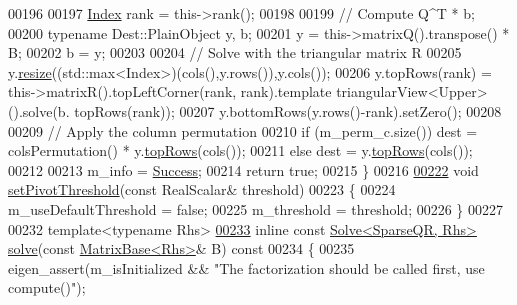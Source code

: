 \begin{DoxyCode}
00196 
00197       \hyperlink{namespace_eigen_a62e77e0933482dafde8fe197d9a2cfde}{Index} rank = this->rank();
00198       
00199       \textcolor{comment}{// Compute Q^T * b;}
00200       \textcolor{keyword}{typename} Dest::PlainObject y, b;
00201       y = this->matrixQ().transpose() * B; 
00202       b = y;
00203       
00204       \textcolor{comment}{// Solve with the triangular matrix R}
00205       y.\hyperlink{group___core___module_a13027a493a68a13496610caf3d81bd3e}{resize}((std::max<Index>)(cols(),y.rows()),y.cols());
00206       y.topRows(rank) = this->matrixR().topLeftCorner(rank, rank).template triangularView<Upper>().solve(b.
      topRows(rank));
00207       y.bottomRows(y.rows()-rank).setZero();
00208       
00209       \textcolor{comment}{// Apply the column permutation}
00210       \textcolor{keywordflow}{if} (m\_perm\_c.size())  dest = colsPermutation() * y.\hyperlink{group___core___module_ad3e01f9216955704228eaeac0b442d24}{topRows}(cols());
00211       \textcolor{keywordflow}{else}                  dest = y.\hyperlink{group___core___module_ad3e01f9216955704228eaeac0b442d24}{topRows}(cols());
00212       
00213       m\_info = \hyperlink{group__enums_gga85fad7b87587764e5cf6b513a9e0ee5ea52581b035f4b59c203b8ff999ef5fcea}{Success};
00214       \textcolor{keywordflow}{return} \textcolor{keyword}{true};
00215     \}
00216 
\hyperlink{group___sparse_q_r___module_adb7bfa65f99e3ef91ed58ea663a850a1}{00222}     \textcolor{keywordtype}{void} \hyperlink{group___sparse_q_r___module_adb7bfa65f99e3ef91ed58ea663a850a1}{setPivotThreshold}(\textcolor{keyword}{const} RealScalar& threshold)
00223     \{
00224       m\_useDefaultThreshold = \textcolor{keyword}{false};
00225       m\_threshold = threshold;
00226     \}
00227     
00232     \textcolor{keyword}{template}<\textcolor{keyword}{typename} Rhs>
\hyperlink{group___sparse_q_r___module_aea13a2c6823cd8408ba49afde9b3d4e4}{00233}     \textcolor{keyword}{inline} \textcolor{keyword}{const} \hyperlink{group___core___module_class_eigen_1_1_solve}{Solve<SparseQR, Rhs>} \hyperlink{group___sparse_q_r___module_aea13a2c6823cd8408ba49afde9b3d4e4}{solve}(\textcolor{keyword}{const} 
      \hyperlink{group___core___module_class_eigen_1_1_matrix_base}{MatrixBase<Rhs>}& B)\textcolor{keyword}{ const }
00234 \textcolor{keyword}{    }\{
00235       eigen\_assert(m\_isInitialized && \textcolor{stringliteral}{"The factorization should be called first, use compute()"});

\end{DoxyCode}
